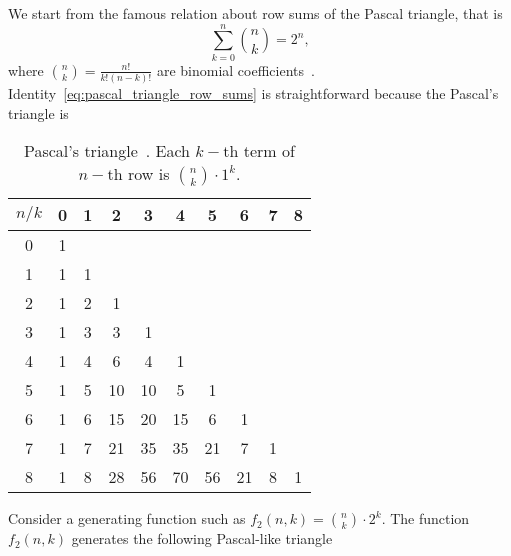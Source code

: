 We start from the famous relation about row sums of the Pascal triangle, that is
\begin{equation}
    \sum_{k=0}^{n}\binom{n}{k} = 2^n,
    \label{eq:pascal_triangle_row_sums}
\end{equation}
where $\binom{n}{k} = \frac{n!}{k!(n-k)!}$ are binomial coefficients~\cite{graham1989concrete}.
Identity~\eqref{eq:pascal_triangle_row_sums} is straightforward because the Pascal's triangle is
\begin{table}[H]
    \begin{tabular}{c|ccccccccc}
        $n/k$ & 0 & 1 & 2  & 3  & 4  & 5  & 6  & 7 & 8 \\ [3px]
        \hline
        0     & 1 &   &    &    &    &    &    &   &   \\
        1     & 1 & 1 &    &    &    &    &    &   &   \\
        2     & 1 & 2 & 1  &    &    &    &    &   &   \\
        3     & 1 & 3 & 3  & 1  &    &    &    &   &   \\
        4     & 1 & 4 & 6  & 4  & 1  &    &    &   &   \\
        5     & 1 & 5 & 10 & 10 & 5  & 1  &    &   &   \\
        6     & 1 & 6 & 15 & 20 & 15 & 6  & 1  &   &   \\
        7     & 1 & 7 & 21 & 35 & 35 & 21 & 7  & 1 &   \\
        8     & 1 & 8 & 28 & 56 & 70 & 56 & 21 & 8 & 1 \\
    \end{tabular}
    \caption{Pascal's triangle~\cite{conway1996pascal}.
    Each $k-$th term of $n-$th row is $\binom{n}{k}\cdot 1^k$.} \label{tab:pascal_triagnle}
\end{table}
Consider a generating function such as $f_2(n,k) = \binom{n}{k}\cdot 2^k$.
The function $f_2(n,k)$ generates the following Pascal-like triangle
